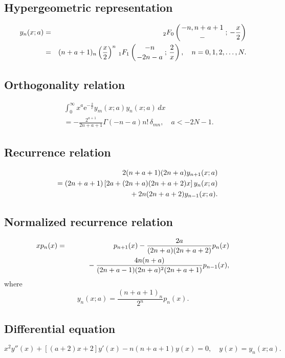 \documentclass[envcountchap,graybox]{svmono}
\newcommand{\hyp}[5]{\mbox{}_{#1}{F}_{#2}
\left(\genfrac{}{}{0pt}{}{#3}{#4}\,;\,#5\right)}
\newcommand{\mathindent}{\hspace{7.5mm}}
\newcommand{\e}{\textrm{e}}
\renewcommand{\Gamma}{\varGamma}
\begin{document}
\par\setcounter{equation}{0}

\subsection*{Hypergeometric representation}
\begin{eqnarray}
\label{DefBessel}
y_n(x;a)&=&\hyp{2}{0}{-n,n+a+1}{-}{-\frac{x}{2}}\\
&=&(n+a+1)_n\left(\frac{x}{2}\right)^n\,\hyp{1}{1}{-n}{-2n-a}{\frac{2}{x}},
\quad n=0,1,2,\ldots,N.\nonumber
\end{eqnarray}

\subsection*{Orthogonality relation}
\begin{eqnarray}
\label{OrtBessel}
& &\int_0^{\infty}x^a\e^{-\frac{2}{x}}y_m(x;a)y_n(x;a)\,dx\nonumber\\
& &=-\frac{2^{a+1}}{2n+a+1}\Gamma(-n-a)n!\,\delta_{mn},\quad a<-2N-1.
\end{eqnarray}

\subsection*{Recurrence relation}
\begin{eqnarray}
\label{RecBessel}
& &2(n+a+1)(2n+a)y_{n+1}(x;a)\nonumber\\
& &{}=(2n+a+1)\left[2a+(2n+a)(2n+a+2)x\right]y_n(x;a)\nonumber\\
& &{}\mathindent{}+2n(2n+a+2)y_{n-1}(x;a).
\end{eqnarray}

\subsection*{Normalized recurrence relation}
\begin{eqnarray}
\label{NormRecBessel}
xp_n(x)&=&p_{n+1}(x)-\frac{2a}{(2n+a)(2n+a+2)}p_n(x)\nonumber\\
& &{}\mathindent{}-\frac{4n(n+a)}{(2n+a-1)(2n+a)^2(2n+a+1)}p_{n-1}(x),
\end{eqnarray}
where
$$y_n(x;a)=\frac{(n+a+1)_n}{2^n}p_n(x).$$

\subsection*{Differential equation}
\begin{equation}
\label{dvBessel}
x^2y''(x)+\left[(a+2)x+2\right]y'(x)-n(n+a+1)y(x)=0,\quad y(x)=y_n(x;a).
\end{equation}
\end{document}
